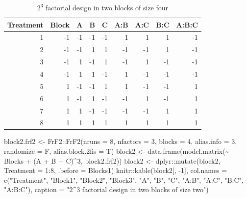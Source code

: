 \documentclass[
]{book}
\newenvironment{Shaded}{\begin{snugshade}}{\end{snugshade}}
\newcommand{\AttributeTok}[1]{\textcolor[rgb]{0.77,0.63,0.00}{#1}}
\newcommand{\DecValTok}[1]{\textcolor[rgb]{0.00,0.00,0.81}{#1}}
\newcommand{\FunctionTok}[1]{\textcolor[rgb]{0.00,0.00,0.00}{#1}}
\newcommand{\NormalTok}[1]{#1}
\newcommand{\OtherTok}[1]{\textcolor[rgb]{0.56,0.35,0.01}{#1}}
\newcommand{\SpecialCharTok}[1]{\textcolor[rgb]{0.00,0.00,0.00}{#1}}
\newcommand{\StringTok}[1]{\textcolor[rgb]{0.31,0.60,0.02}{#1}}
\theoremstyle{definition}
\theoremstyle{definition}
\theoremstyle{definition}
\theoremstyle{definition}
\theoremstyle{remark}
\begin{document}
\begin{table}

\caption{\label{tab:frf2-block-1}$2^3$ factorial design in two blocks of size four}
\centering
\begin{tabular}[t]{r|r|r|r|r|r|r|r|r}
\hline
Treatment & Block & A & B & C & A:B & A:C & B:C & A:B:C\\
\hline
1 & -1 & -1 & -1 & -1 & 1 & 1 & 1 & -1\\
\hline
2 & -1 & -1 & 1 & 1 & -1 & -1 & 1 & -1\\
\hline
3 & -1 & 1 & -1 & 1 & -1 & 1 & -1 & -1\\
\hline
4 & -1 & 1 & 1 & -1 & 1 & -1 & -1 & -1\\
\hline
5 & 1 & -1 & -1 & 1 & 1 & -1 & -1 & 1\\
\hline
6 & 1 & -1 & 1 & -1 & -1 & 1 & -1 & 1\\
\hline
7 & 1 & 1 & -1 & -1 & -1 & -1 & 1 & 1\\
\hline
8 & 1 & 1 & 1 & 1 & 1 & 1 & 1 & 1\\
\hline
\end{tabular}
\end{table}

\begin{Shaded}
\begin{Highlighting}[]
\NormalTok{block2.frf2 }\OtherTok{\textless{}{-}}\NormalTok{ FrF2}\SpecialCharTok{::}\FunctionTok{FrF2}\NormalTok{(}\AttributeTok{nruns =} \DecValTok{8}\NormalTok{, }\AttributeTok{nfactors =} \DecValTok{3}\NormalTok{, }\AttributeTok{blocks =} \DecValTok{4}\NormalTok{, }
                          \AttributeTok{alias.info =} \DecValTok{3}\NormalTok{, }\AttributeTok{randomize =}\NormalTok{ F, }\AttributeTok{alias.block.2fis =}\NormalTok{ T)}
\NormalTok{block2 }\OtherTok{\textless{}{-}} \FunctionTok{data.frame}\NormalTok{(}\FunctionTok{model.matrix}\NormalTok{(}\SpecialCharTok{\textasciitilde{}}\NormalTok{ Blocks }\SpecialCharTok{+}\NormalTok{ (A }\SpecialCharTok{+}\NormalTok{ B }\SpecialCharTok{+}\NormalTok{ C)}\SpecialCharTok{\^{}}\DecValTok{3}\NormalTok{, block2.frf2))}
\NormalTok{block2 }\OtherTok{\textless{}{-}}\NormalTok{ dplyr}\SpecialCharTok{::}\FunctionTok{mutate}\NormalTok{(block2, }\AttributeTok{Treatment =} \DecValTok{1}\SpecialCharTok{:}\DecValTok{8}\NormalTok{, }\AttributeTok{.before =}\NormalTok{ Blocks1)}
\NormalTok{knitr}\SpecialCharTok{::}\FunctionTok{kable}\NormalTok{(block2[, }\SpecialCharTok{{-}}\DecValTok{1}\NormalTok{], }
             \AttributeTok{col.names =} \FunctionTok{c}\NormalTok{(}\StringTok{"Treatment"}\NormalTok{, }\StringTok{"Block1"}\NormalTok{, }\StringTok{"Block2"}\NormalTok{, }\StringTok{"Block3"}\NormalTok{, }
                           \StringTok{"A"}\NormalTok{, }\StringTok{"B"}\NormalTok{, }\StringTok{"C"}\NormalTok{, }
                           \StringTok{"A:B"}\NormalTok{, }\StringTok{"A:C"}\NormalTok{, }\StringTok{"B:C"}\NormalTok{, }\StringTok{"A:B:C"}\NormalTok{),}
             \AttributeTok{caption =} \StringTok{"$2\^{}3$ factorial design in two blocks of size two"}\NormalTok{)}
\end{Highlighting}
\end{Shaded}
\end{document}
